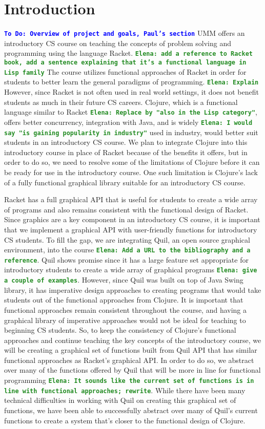 \documentclass[12pt]{article}
\newcommand{\comment}[1]{{\bf \tt  {#1}}}
\newcommand{\emcomment}[1]{\textcolor{ForestGreen}{\comment{Elena: {#1}}}}
\newcommand{\todo}[1]{\textcolor{blue}{\comment{To Do: {#1}}}}
\begin{document}
\section{Introduction}\label{sec:intro}
\todo{Overview of project and goals, Paul's section}
UMM offers an introductory CS course on teaching the concepts of problem solving and programming using the language Racket. 
\emcomment{add a reference to Racket book, add a sentence explaining that it's a functional language in Lisp family} The course utilizes functional approaches of Racket in order for students to better learn the general paradigms of programming.  \emcomment{Explain} However, since Racket is not often used in real world settings, it does not benefit students as much in their future CS careers. Clojure, which is a functional language similar to Racket \emcomment{Replace by "also in the Lisp category"}, offers better concurrency, integration with Java, and is widely \emcomment{I would say "is gaining popularity in industry"} used in industry, would better suit students in an introductory CS course.  We plan to integrate Clojure into this introductory course in place of Racket because of the benefits it offers, but in order to do so, we need to resolve some of the limitations of Clojure before it can be ready for use in the introductory course. One such limitation is Clojure's lack of a fully functional graphical library suitable for an introductory CS course.  

Racket has a full graphical API that is useful for students to create a wide array of programs and also remains consistent with the functional design of Racket. Since graphics are a key component in an introductory CS course, it is important that we implement a graphical API with user-friendly functions for introductory CS students. To fill the gap, we are integrating Quil, an open source graphical environment, into the course \emcomment{Add a URL to the bibliography and a reference}. Quil shows promise since it has a large feature set appropriate for introductory students to create a wide array of graphical programs \emcomment{give a couple of examples}. However, since Quil was built on top of Java Swing library, it has imperative design approaches to creating programs that would take students out of the functional approaches from Clojure. It is important that functional approaches remain consistent throughout the course, and having a graphical library of imperative approaches would not be ideal for teaching to beginning CS students. So, to keep the consistency of Clojure's functional approaches and continue teaching the key concepts of the introductory course, we will be creating a graphical set of functions built from Quil API that has similar functional approaches as Racket's graphical API. In order to do so, we %
abstract over many of the functions offered by Quil that will be more in line for functional programming \emcomment{It sounds like the current set of functions is in line with functional approaches; rewrite}. While there have been many technical difficulties in working with Quil on creating this graphical set of functions, we have been able to successfully abstract over many of Quil's current functions to create a system that’s closer to the functional design of Clojure. 
\end{document}
